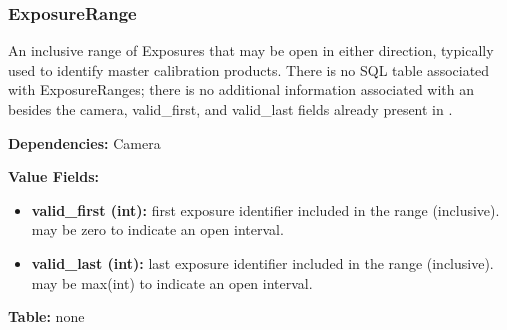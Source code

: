 \subsubsection{ExposureRange}
\label{unit:ExposureRange}

An inclusive range of Exposures that may be open in either direction,
typically used to identify master calibration products. There is no
SQL table associated with ExposureRanges; there is no additional
information associated with an  besides the
camera, valid\_first, and valid\_last fields already present in
.

\textbf{Dependencies:} Camera

\textbf{Value Fields:}
\begin{itemize}
  \item \textbf{valid\_first (int):}
      first exposure identifier included in the range (inclusive).  may
      be zero to indicate an open interval.
  \item \textbf{valid\_last (int):}
      last exposure identifier included in the range (inclusive).  may
      be max(int) to indicate an open interval.
\end{itemize}

\textbf{Table:} none
